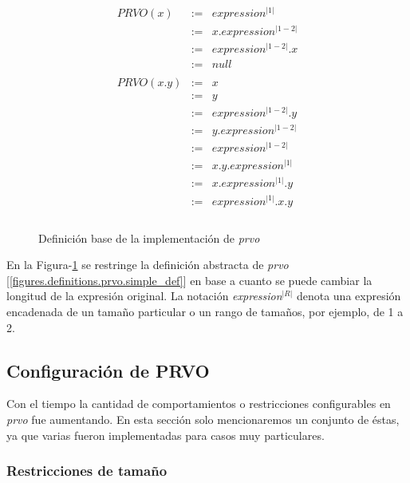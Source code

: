 \begin{figure}
	\begin{displaymath}
	\begin{array}{lll}
  PRVO(x)		& :=	& expression^{|1|} \\
  & := & x.expression^{|1-2|} \\
  & := & expression^{|1-2|}.x \\
  & := & null \\
	
  \\
  PRVO(x.y)	& :=	& x \\
  & :=	& 	y \\
  & :=	& expression^{|1-2|}.y \\
  & :=	& y.expression^{|1-2|} \\
  & :=	& expression^{|1-2|} \\
  & :=	& x.y.expression^{|1|} \\
  & :=	& x.expression^{|1|}.y \\
  & :=	& expression^{|1|}.x.y \\
  \\
	
	\end{array}
	\end{displaymath}
	\caption{Definici\'on base de la implementaci\'on de \emph{prvo}}
	\label{figures.definitions.prvo.impl_def}
\end{figure}

En la Figura-\ref{figures.definitions.prvo.impl_def} se restringe la definici\'on abstracta de \emph{prvo} [\ref{figures.definitions.prvo.simple_def}] en base a cuanto se puede cambiar la longitud de la expresi\'on original. La notaci\'on \emph{expression$^{|R|}$} denota una expresi\'on encadenada de un tama\~no particular o un rango de tama\~nos, por ejemplo, de 1 a 2.

\subsection{Configuraci\'on de PRVO}

Con el tiempo la cantidad de comportamientos o restricciones configurables en \emph{prvo} fue aumentando. En esta secci\'on solo mencionaremos un conjunto de \'estas, ya que varias fueron implementadas para casos muy particulares.

\subsubsection{Restricciones de tama\~no}
\label{sec:implementation.prvo.restrictions.size}

